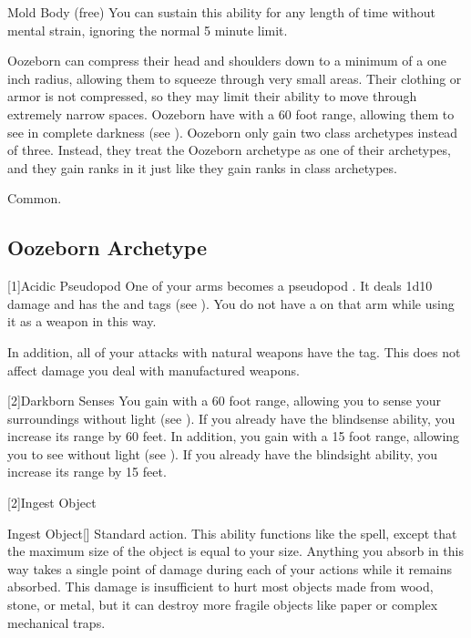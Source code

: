 \begin{raggeditemize}
\begin{sustainability}{Mold Body}{ (free)}
        You can sustain this ability for any length of time without mental strain, ignoring the normal 5 minute limit.
      \end{sustainability}
     Oozeborn can compress their head and shoulders down to a minimum of a one inch radius, allowing them to squeeze through very small areas.
      Their clothing or armor is not compressed, so they may limit their ability to move through extremely narrow spaces.
     Oozeborn have  with a 60 foot range, allowing them to see in complete darkness (see ).
     Oozeborn only gain two class archetypes instead of three.
      Instead, they treat the Oozeborn archetype as one of their archetypes, and they gain ranks in it just like they gain ranks in class archetypes.
  \end{raggeditemize}
   Common.

  \subsection{Oozeborn Archetype}

    [1]{Acidic Pseudopod} One of your arms becomes a pseudopod .
      It deals 1d10 damage and has the \atAcid and  tags (see ).
      You do not have a  on that arm while using it as a weapon in this way.

      In addition, all of your attacks with natural weapons have the \atAcid tag.
      This does not affect damage you deal with manufactured weapons.

    [2]{Darkborn Senses} You gain  with a 60 foot range, allowing you to sense your surroundings without light (see ).
      If you already have the blindsense ability, you increase its range by 60 feet.
      In addition, you gain  with a 15 foot range, allowing you to see without light (see ).
      If you already have the blindsight ability, you increase its range by 15 feet.

    [2]{Ingest Object}
      \begin{activeability}{Ingest Object}[\atAcid]
        \abilityusagetime Standard action.
        \rankline
        This ability functions like the  spell, except that the maximum size of the object is equal to your size.
        Anything you absorb in this way takes a single point of  damage during each of your actions while it remains absorbed.
        This damage is insufficient to hurt most objects made from wood, stone, or metal, but it can destroy more fragile objects like paper or complex mechanical traps.
      \end{activeability}

